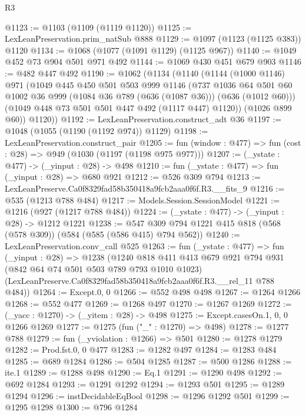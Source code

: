\begin{lexlean}{R3}
\begin{coremodule}
@1123 := @1103 (@1109 (@1119 @1120))
@1125 := LexLeanPreservation.prim_natSub @888
@1129 := @1097 (@1123 (@1125 @383)) @1120
@1134 := @1068 (@1077 (@1091 @1129) (@1125 @967))
@1140 := @1049 @452 @73 @904 @501 @971 @492
@1144 := @1069 @430 @451 @679 @903
@1146 := @482 @447 @492
@1190 := @1062
    (@1134
      (@1140
        (@1144
          (@1000 @1146)
          @971
          (@1049
            @445
            @450
            @501
            @503
            @999
            @1146
            (@737
              @1036
              @64
              @501
              @60
              @1002
              @36
              @999
              (@1084 @36 @789 (@636 (@1087 @36)))
              (@636 (@1012 @60)))
            (@1049 @448 @73 @501 @501 @447 @492 (@1117 @447) @1120))
          (@1026 @899 @60))
        @1120))
@1192 := LexLeanPreservation.construct_adt @36
@1197 := @1048 (@1055 (@1190 (@1192 @974)) @1129)
@1198 := LexLeanPreservation.construct_pair
@1205 := fun (window : @477) => fun (cost : @28) => @949 (@1030 (@1197 (@1198 @975 @977)))
@1207 := (_ystate : @477) -> (_yinput : @28) -> @498
@1210 := fun (_ystate : @477) => fun (_yinput : @28) => @680 @921
@1212 := @526 @309 @794
@1213 := LexLeanPreserve.Ca0f8329fad58b350418a9fcb2aaa0f6f.R3.__fits_9
@1216 := @535 (@1213 @788 @484)
@1217 := Models.Session.SessionModel
@1221 := @1216 (@927 (@1217 @788 @484))
@1224 := (_ystate : @477) -> (_yinput : @28) -> @1212 @1221
@1238 := @547 @309 @794 @1221 @415 @818 (@568 (@578 @309)) (@584 (@585 (@586 @415) @794 @562))
@1240 := LexLeanPreservation.conv_call @525
@1263 := fun (_ystate : @477) =>
  fun (_yinput : @28) =>
  @1238
    (@1240
      @818
      @411
      @413
      @679
      @921
      @794
      @931
      (@842 @64 @74 @501 @503 @789 @793 @1010 @1023)
      (LexLeanPreserve.Ca0f8329fad58b350418a9fcb2aaa0f6f.R3.__rel_11 @788 @484))
@1264 := Except.{0, 0}
@1266 := @552 @498 @498
@1267 := @1264 @1266
@1268 := @552 @477
@1269 := @1268 @497
@1270 := @1267 @1269
@1272 := (_yacc : @1270) -> (_yitem : @28) -> @498
@1275 := Except.casesOn.{1, 0, 0} @1266 @1269
@1277 := @1275 (fun ("_" : @1270) => @498)
@1278 := @1277 @788
@1279 := fun (_yviolation : @1266) => @501
@1280 := @1278 @1279
@1282 := Prod.fst.{0, 0} @477
@1283 := @1282 @497
@1284 := @1283 @484
@1285 := @689 @1284
@1286 := @504 @1285
@1287 := @500 @1286
@1288 := ite.{1}
@1289 := @1288 @498
@1290 := Eq.{1}
@1291 := @1290 @498
@1292 := @692 @1284
@1293 := @1291 @1292
@1294 := @1293 @501
@1295 := @1289 @1294
@1296 := instDecidableEqBool
@1298 := @1296 @1292 @501
@1299 := @1295 @1298
@1300 := @796 @1284

\end{coremodule}
\end{lexlean}
